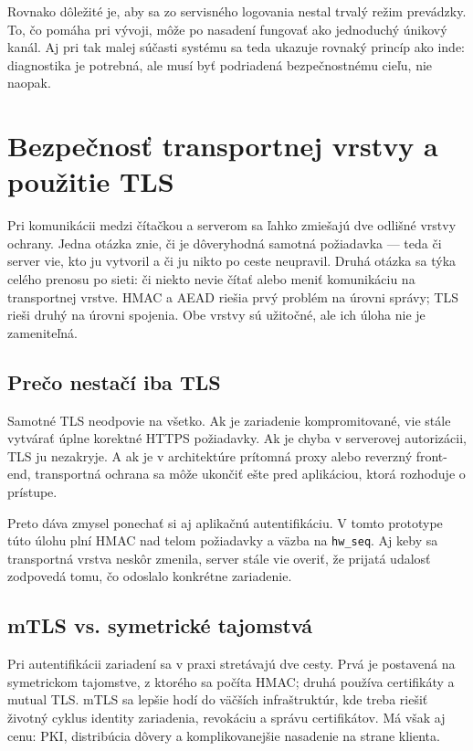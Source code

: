 \documentclass[journal,a4paper,onecolumn]{IEEEtran}
\begin{document}
Rovnako dôležité je, aby sa zo servisného logovania nestal trvalý režim prevádzky. To, čo pomáha pri vývoji, môže po nasadení fungovať ako jednoduchý únikový kanál. Aj pri tak malej súčasti systému sa teda ukazuje rovnaký princíp ako inde: diagnostika je potrebná, ale musí byť podriadená bezpečnostnému cieľu, nie naopak.


\section{Bezpečnosť transportnej vrstvy a použitie TLS}

Pri komunikácii medzi čítačkou a serverom sa ľahko zmiešajú dve odlišné vrstvy ochrany. Jedna otázka znie, či je dôveryhodná samotná požiadavka --- teda či server vie, kto ju vytvoril a či ju nikto po ceste neupravil. Druhá otázka sa týka celého prenosu po sieti: či niekto nevie čítať alebo meniť komunikáciu na transportnej vrstve. HMAC a AEAD riešia prvý problém na úrovni správy; TLS rieši druhý na úrovni spojenia. Obe vrstvy sú užitočné, ale ich úloha nie je zameniteľná.\cite{RFC8446,RFC9325}

\subsection{Prečo nestačí iba TLS}

Samotné TLS neodpovie na všetko. Ak je zariadenie kompromitované, vie stále vytvárať úplne korektné HTTPS požiadavky. Ak je chyba v serverovej autorizácii, TLS ju nezakryje. A ak je v architektúre prítomná proxy alebo reverzný front-end, transportná ochrana sa môže ukončiť ešte pred aplikáciou, ktorá rozhoduje o prístupe.

Preto dáva zmysel ponechať si aj aplikačnú autentifikáciu. V tomto prototype túto úlohu plní HMAC nad telom požiadavky a väzba na \texttt{hw\_seq}. Aj keby sa transportná vrstva neskôr zmenila, server stále vie overiť, že prijatá udalosť zodpovedá tomu, čo odoslalo konkrétne zariadenie.

\subsection{mTLS vs. symetrické tajomstvá}

Pri autentifikácii zariadení sa v praxi stretávajú dve cesty. Prvá je postavená na symetrickom tajomstve, z ktorého sa počíta HMAC; druhá používa certifikáty a mutual TLS. mTLS sa lepšie hodí do väčších infraštruktúr, kde treba riešiť životný cyklus identity zariadenia, revokáciu a správu certifikátov. Má však aj cenu: PKI, distribúcia dôvery a komplikovanejšie nasadenie na strane klienta.
\end{document}
